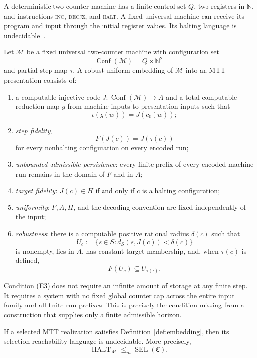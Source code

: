 \documentclass[11pt]{article}
\begin{document}
A deterministic two-counter machine has a finite control set $Q$, two
registers in $\mathbb N$, and instructions
\textsc{inc}, \textsc{decjz}, and \textsc{halt}.  A fixed universal machine
can receive its program and input through the initial register values.
Its halting language is undecidable~\cite{Minsky,Turing}.

\begin{definition}\label{def:embedding}
Let $\mathcal M$ be a fixed universal two-counter machine with configuration
set
\[
\operatorname{Conf}(\mathcal M)=Q\times\mathbb N^2
\]
and partial step map $\tau$.  A robust uniform embedding of $\mathcal M$ into
an MTT presentation consists of:
\begin{enumerate}[label=(E\arabic*)]
\item a computable injective code
$J:\operatorname{Conf}(\mathcal M)\to A$ and a total computable reduction map
$g$ from machine inputs to presentation inputs such that
\[
\iota(g(w))=J(c_0(w));
\]
\item \emph{step fidelity},
\[
F(J(c))=J(\tau(c))
\]
for every nonhalting configuration on every encoded run;
\item \emph{unbounded admissible persistence}: every finite prefix of every
encoded machine run remains in the domain of $F$ and in $A$;
\item \emph{target fidelity}: $J(c)\in H$ if and only if $c$ is a halting
configuration;
\item \emph{uniformity}: $F,A,H$, and the decoding convention are fixed
independently of the input;
\item \emph{robustness}: there is a computable positive rational radius
$\delta(c)$ such that
\[
U_c:=\{s\in S:d_S(s,J(c))<\delta(c)\}
\]
is nonempty, lies in $A$, has constant target membership, and, when
$\tau(c)$ is defined,
\[
F(U_c)\subseteq U_{\tau(c)}.
\]
\end{enumerate}
\end{definition}

Condition (E3) does not require an infinite amount of storage at any finite
step.  It requires a system with no fixed global counter cap across the
entire input family and all finite run prefixes.  This is precisely the
condition missing from a construction that supplies only a finite admissible
horizon.

\begin{theorem}
\label{thm:undecidable}
If a selected MTT realization satisfies
Definition~\ref{def:embedding}, then its selection reachability language is
undecidable.  More precisely,
\[
\operatorname{HALT}_{\mathcal M}
\leq_m
\operatorname{SEL}(\mathfrak C).
\]
\end{theorem}
\end{document}
